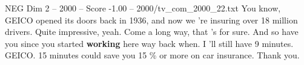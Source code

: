\begin{textsample}{NEG Dim 2 – 2000 – Score -1.00 – 2000/tv\_com\_2000\_22.txt}  \label{ex:f2_neg_017}
You know, GEICO opened its doors back in 1936, and now we 're insuring over 18 million drivers.
Quite impressive, yeah.
Come a long way, that 's for sure.
And so have you since you started \textbf{working} here way back when.
I 'll still have 9 minutes.
GEICO. 15 minutes could save you 15 \% or more on car insurance.
Thank you.

\end{textsample}
